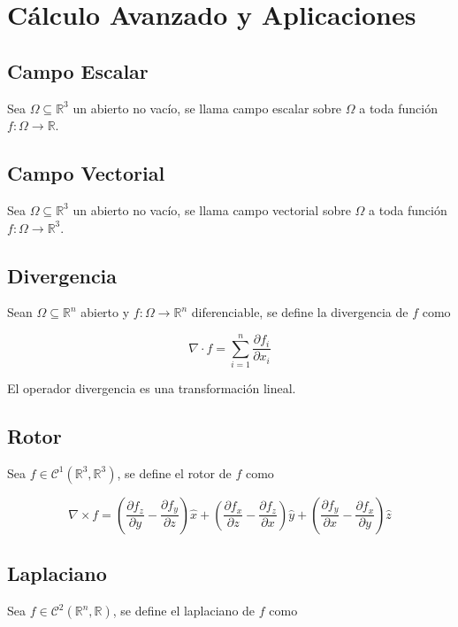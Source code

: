 \section{Cálculo Avanzado y Aplicaciones}

\subsection{Campo Escalar}

Sea $\Omega\subseteq\mathbb{R}^3$ un abierto no vacío, se llama campo escalar sobre $\Omega$ a toda función $f:\Omega\to\mathbb{R}$.

\subsection{Campo Vectorial}

Sea $\Omega\subseteq\mathbb{R}^3$ un abierto no vacío, se llama
campo vectorial sobre $\Omega$ a toda función $f:\Omega\to\mathbb{R}^3$.

\subsection{Divergencia}

Sean $\Omega\subseteq\mathbb{R}^n$ abierto y $f:\Omega\to\mathbb{R}^n$ diferenciable, se define la divergencia de $f$ como

\[\nabla\cdot f=\sum^n_{i=1} \frac{\partial f_i}{\partial x_i}\]

El operador divergencia es una transformación lineal.

\subsection{Rotor}

Sea $f\in\mathcal{C}^1(\mathbb{R}^3,\mathbb{R}^3)$, se define el rotor de $f$ como

\[\nabla\times f = \left(\frac{\partial f_z}{\partial y}-
\frac{\partial f_y}{\partial z}\right)\hat{x}+
\left(\frac{\partial f_x}{\partial z}-
\frac{\partial f_z}{\partial x}\right)\hat{y}+
\left(\frac{\partial f_y}{\partial x}-
\frac{\partial f_x}{\partial y}\right)\hat{z}\]

\subsection{Laplaciano}

Sea $f\in\mathcal{C}^2(\mathbb{R}^n, \mathbb{R})$, se define el laplaciano de $f$ como

